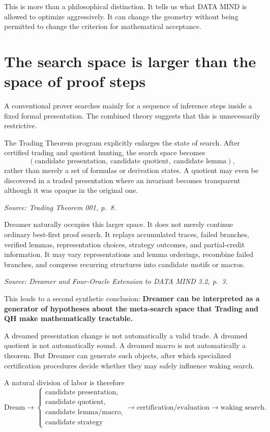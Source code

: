 \documentclass[11pt]{article}
\newcommand{\src}[1]{\par\smallskip\noindent\textit{Source: #1}\normalsize}
\begin{document}
This is more than a philosophical distinction. It tells us what DATA MIND is allowed to optimize aggressively. It can change the geometry without being permitted to change the criterion for mathematical acceptance.

\section{The search space is larger than the space of proof steps}

A conventional prover searches mainly for a sequence of inference steps inside a fixed formal presentation. The combined theory suggests that this is unnecessarily restrictive.

The Trading Theorem program explicitly enlarges the state of search. After certified trading and quotient hunting, the search space becomes
\[
(\text{candidate presentation},\ \text{candidate quotient},\ \text{candidate lemma}),
\]
rather than merely a set of formulas or derivation states. A quotient may even be discovered in a traded presentation where an invariant becomes transparent although it was opaque in the original one.
\src{\emph{Trading Theorem 001}, p.~8.}

Dreamer naturally occupies this larger space. It does not merely continue ordinary best-first proof search. It replays accumulated traces, failed branches, verified lemmas, representation choices, strategy outcomes, and partial-credit information. It may vary representations and lemma orderings, recombine failed branches, and compress recurring structures into candidate motifs or macros.
\src{\emph{Dreamer and Four-Oracle Extension to DATA MIND 3.2}, p.~3.}

This leads to a second synthetic conclusion: \textbf{Dreamer can be interpreted as a generator of hypotheses about the meta-search space that Trading and QH make mathematically tractable.}

A dreamed presentation change is not automatically a valid trade. A dreamed quotient is not automatically sound. A dreamed macro is not automatically a theorem. But Dreamer can generate such objects, after which specialized certification procedures decide whether they may safely influence waking search.

A natural division of labor is therefore
\[
\text{Dream}
\longrightarrow
\begin{cases}
\text{candidate presentation},\\
\text{candidate quotient},\\
\text{candidate lemma/macro},\\
\text{candidate strategy}
\end{cases}
\longrightarrow
\text{certification/evaluation}
\longrightarrow
\text{waking search}.
\]
\end{document}
